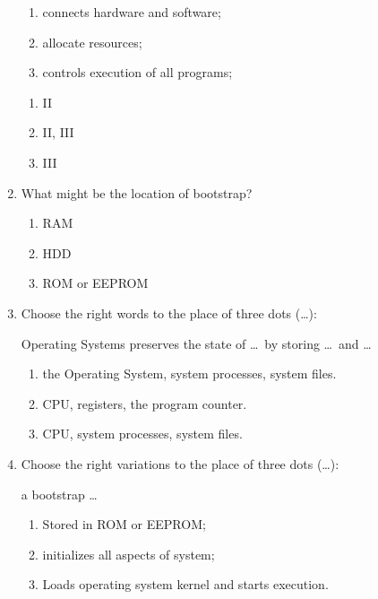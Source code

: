 \documentclass[paper=8.2in:11.6in]{scrartcl}
\begin{document}
\begin{enumerate}
\begin{enumerate}[label=\Roman*.]
\item connects hardware and software;
\item allocate resources;
\item controls execution of all programs;

\end{enumerate}

\begin{enumerate}[label=\alph*)]

\item II
\item II, III
\item III

\end{enumerate}

\item What might be the location of bootstrap?

\begin{enumerate}[label=\alph*)]

\item RAM
\item HDD
\item ROM or EEPROM

\end{enumerate}

\item Choose the right words to the place of three dots (\ldots):

Operating Systems preserves the state of \ldots \ by storing \ldots \ and \ldots

\begin{enumerate}[label=\alph*)]

\item the Operating System, system processes, system files.
\item CPU, registers, the program counter.
\item CPU, system processes, system files.

\end{enumerate}

\item Choose the right variations to the place of three dots (\ldots):

a bootstrap \ldots

\begin{enumerate}[label=\Roman*.]

\item Stored in ROM or EEPROM;
\item initializes all aspects of system;
\item Loads operating system kernel and starts execution.


\end{enumerate}
\end{enumerate}
\end{document}

